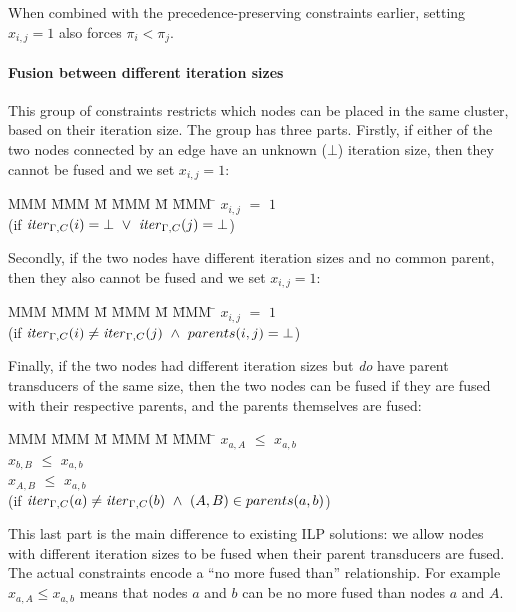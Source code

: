 When combined with the precedence-preserving constraints earlier, setting $x_{i,j} = 1$ also forces $\pi_i < \pi_j$. 


\paragraph{Fusion between different iteration sizes} This group of constraints restricts which nodes can be placed in the same cluster, based on their iteration size.
The group has three parts. 
Firstly, if either of the two nodes connected by an edge have an unknown ($\bot$) iteration size, then they cannot be fused and we set $x_{i,j} = 1$:
\begin{tabbing}
MMM     \= MMM \= M \= MMM \= M \= MMM \= \kill
        \> $x_{i,j}$   \> $=$   \> $1$          \>       \>     \\
        \> (if $\mathit{iter}_{\Gamma,C}(i) = \bot 
                ~\vee~ \mathit{iter}_{\Gamma,C}(j) = \bot$)
\end{tabbing}

Secondly, if the two nodes have different iteration sizes and no common parent, then they also cannot be fused and we set $x_{i,j} = 1$:
\begin{tabbing}
MMM     \= MMM \= M \= MMM \= M \= MMM \= \kill
        \> $x_{i,j}$   \> $=$   \> $1$          \>       \>     \\
        \> (if $\mathit{iter}_{\Gamma,C}(i) \not= \mathit{iter}_{\Gamma,C}(j) 
                ~\wedge~ parents(i,j) = \bot$)
\end{tabbing}

Finally, if the two nodes had different iteration sizes but \emph{do} have parent transducers of the same size, then the two nodes can be fused if they are fused with their respective parents, and the parents themselves are fused:
\begin{tabbing}
MMM     \= MMM \= M \= MMM \= M \= MMM \= \kill
        \> $x_{a,A}$   \> $\le$ \> $x_{a,b}$    \>       \>     \\
        \> $x_{b,B}$   \> $\le$ \> $x_{a,b}$    \>       \>     \\
        \> $x_{A,B}$   \> $\le$ \> $x_{a,b}$    \>       \>     \\
        \> (if $\mathit{iter}_{\Gamma,C}(a) \not= \mathit{iter}_{\Gamma,C}(b) 
                ~\wedge~ (A,B) \in parents(a,b)$)
\end{tabbing}

This last part is the main difference to existing ILP solutions: we allow nodes with different iteration sizes to be fused when their parent transducers are fused. The actual constraints encode a ``no more fused than'' relationship. For example $x_{a,A} \le x_{a,b}$ means that nodes $a$ and $b$ can be no more fused than nodes $a$ and $A$. 

